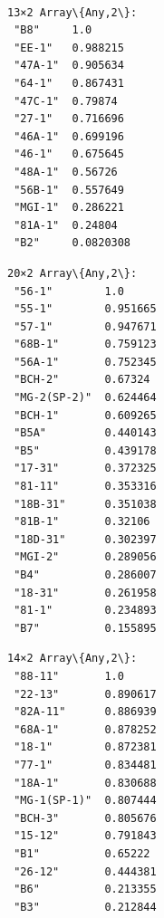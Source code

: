 \documentclass[11pt]{article}
\begin{document}
    \begin{Verbatim}[commandchars=\\\{\}]

    \end{Verbatim}

    \begin{center}
    \end{center}
    { \hspace*{\fill} \\}

    \begin{Verbatim}[commandchars=\\\{\}]

    \end{Verbatim}


    \begin{Verbatim}[commandchars=\\\{\}]
13×2 Array\{Any,2\}:
 "B8"     1.0
 "EE-1"   0.988215
 "47A-1"  0.905634
 "64-1"   0.867431
 "47C-1"  0.79874
 "27-1"   0.716696
 "46A-1"  0.699196
 "46-1"   0.675645
 "48A-1"  0.56726
 "56B-1"  0.557649
 "MGI-1"  0.286221
 "81A-1"  0.24804
 "B2"     0.0820308
    \end{Verbatim}



    \begin{Verbatim}[commandchars=\\\{\}]
20×2 Array\{Any,2\}:
 "56-1"        1.0
 "55-1"        0.951665
 "57-1"        0.947671
 "68B-1"       0.759123
 "56A-1"       0.752345
 "BCH-2"       0.67324
 "MG-2(SP-2)"  0.624464
 "BCH-1"       0.609265
 "B5A"         0.440143
 "B5"          0.439178
 "17-31"       0.372325
 "81-11"       0.353316
 "18B-31"      0.351038
 "81B-1"       0.32106
 "18D-31"      0.302397
 "MGI-2"       0.289056
 "B4"          0.286007
 "18-31"       0.261958
 "81-1"        0.234893
 "B7"          0.155895
    \end{Verbatim}



    \begin{Verbatim}[commandchars=\\\{\}]
14×2 Array\{Any,2\}:
 "88-11"       1.0
 "22-13"       0.890617
 "82A-11"      0.886939
 "68A-1"       0.878252
 "18-1"        0.872381
 "77-1"        0.834481
 "18A-1"       0.830688
 "MG-1(SP-1)"  0.807444
 "BCH-3"       0.805676
 "15-12"       0.791843
 "B1"          0.65222
 "26-12"       0.444381
 "B6"          0.213355
 "B3"          0.212844
    \end{Verbatim}
\end{document}
